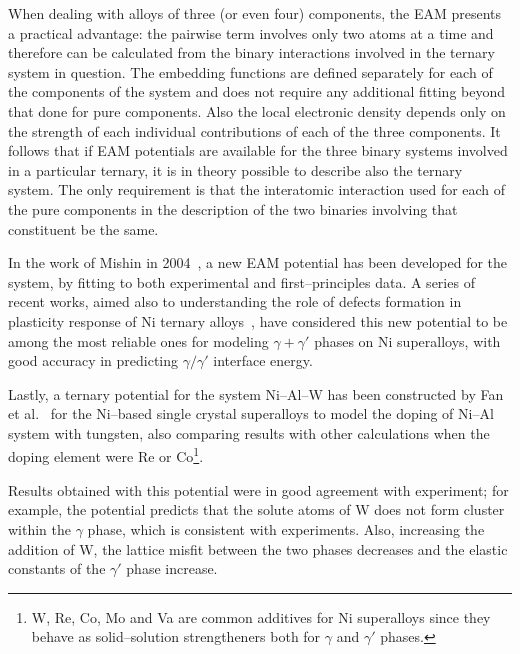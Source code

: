 When dealing with alloys of three (or even four) components, the EAM presents a practical advantage: the pairwise term involves only two atoms at a time and therefore can be calculated from the binary interactions involved in the ternary system in question. The embedding functions are defined separately for each of the components of the system and does not require any additional fitting beyond that done for pure components. Also the local electronic density depends only on the strength of each individual contributions of each of the three components. It follows that if EAM potentials are available for the three binary systems involved in a particular ternary, it is in theory possible to describe also the ternary system. The only requirement is that the interatomic interaction used for each of the pure components in the description of the two binaries involving that constituent be the same.

In the work of Mishin in 2004~\cite{Mishin2004}, a new EAM potential has been developed for the  system, by fitting to both experimental and first--principles data. A series of recent works, aimed also to understanding the role of defects formation in plasticity response of Ni ternary alloys~\cite{Bianchini2016}, have considered this new potential to be among the most reliable ones for modeling $\gamma+\gamma'$ phases on Ni superalloys, with good accuracy in predicting $\gamma/\gamma'$ interface energy.

Lastly, a ternary potential for the system Ni--Al--W has been constructed by Fan et al.~\cite{Fan2015} for the Ni--based single crystal superalloys to model the doping of Ni--Al system with tungsten, also comparing results with other calculations when the doping element were Re or Co\footnote{W, Re, Co, Mo and Va are common additives for Ni superalloys since they behave as solid--solution strengtheners both for $\gamma$ and $\gamma'$ phases.}.

Results obtained with this potential were in good agreement with experiment; for example, the potential predicts that the solute atoms of W does not form cluster within the $\gamma$ phase, which is consistent with experiments. Also, increasing the addition of W, the lattice misfit between the two phases decreases and the elastic constants of the $\gamma'$ phase increase.

